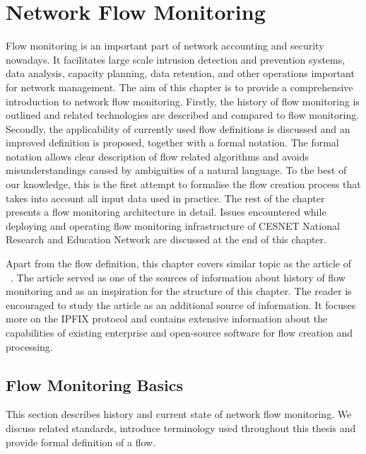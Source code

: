 \chapter{Network Flow Monitoring}

Flow monitoring is an important part of network accounting and security nowadays. It facilitates large scale intrusion detection and prevention systems, data analysis, capacity planning, data retention, and other operations important for network management. The aim of this chapter is to provide a comprehensive introduction to network flow monitoring. Firstly, the history of flow monitoring is outlined and related technologies are described and compared to flow monitoring. Secondly, the applicability of currently used flow definitions is discussed and an improved definition is proposed, together with a formal notation. The formal notation allows clear description of flow related algorithms and avoids misunderstandings caused by ambiguities of a natural language. To the best of our knowledge, this is the first attempt to formalise the flow creation process that takes into account all input data used in practice. The rest of the chapter presents a flow monitoring architecture in detail. Issues encountered while deploying and operating flow monitoring infrastructure of CESNET National Research and Education Network are discussed at the end of this chapter. 

Apart from the flow definition, this chapter covers similar topic as the article of \citeauthor{Hofstede-2014-Flow}~\cite{Hofstede-2014-Flow}. The article served as one of the sources of information about history of flow monitoring and as an inspiration for the structure of this chapter. The reader is encouraged to study the article as an additional source of information. It focuses more on the IPFIX protocol and contains extensive information about the capabilities of existing enterprise and open-source software for flow creation and processing. 


\section{Flow Monitoring Basics}

This section describes history and current state of network flow monitoring. We discuss related standards, introduce terminology used throughout this thesis and provide formal definition of a flow. 

